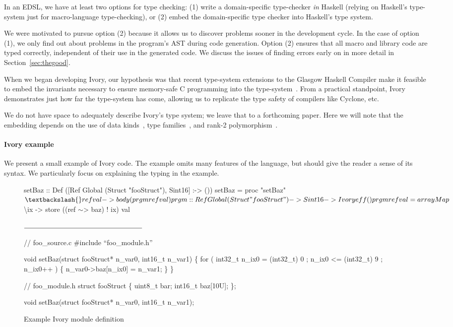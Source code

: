 In an EDSL, we have at least two options for type checking: (1) write a
domain-specific type-checker \emph{in} Haskell (relying on Haskell's type-system
just for macro-language type-checking), or (2) embed the domain-specific type
checker into Haskell's type system.

We were motivated to pursue option (2) because it allows us to discover problems
sooner in the development cycle. In the case of option (1), we only find out
about problems in the program's AST during code generation. Option (2) ensures
that all macro and library code are typed correctly, independent of their use in
the generated code. We discuss the issues of finding errors early on in more
detail in Section~\ref{sec:thegood}.

When we began developing Ivory, our hypothesis  was that recent type-system
extensions to the Glasgow Haskell Compiler make it feasible to embed the
invariants necessary to ensure memory-safe C programming into the
type-system~\cite{dephaskell}. From a practical standpoint, Ivory demonstrates
just how far the type-system has come, allowing us to replicate the type safety
of compilers like Cyclone, etc.

We do not have space to adequately describe Ivory's type system; we leave that
to a forthcoming paper.  Here we will note that the embedding depends on the use
of data kinds~\cite{datakinds}, type families~\cite{typefamilies}, and rank-2
polymorphism~\cite{stmonad}.


\paragraph{Ivory example}
We present a small example of Ivory code.  The example omits many features of
the language, but should give the reader a sense of its syntax.  We particularly
focus on explaining the typing in the example.

\begin{figure}
    \begin{smcode}

setBaz :: Def ([Ref Global (Struct "fooStruct"), Sint16] :-> ())
setBaz = proc "setBaz" $ \textbackslash{}ref val -> body (prgm ref val)

prgm :: Ref Global (Struct "fooStruct") -> Sint16 -> Ivory eff ()
prgm ref val = arrayMap $ \textbackslash{}ix ->
                 store ((ref \(\sim\)> baz) ! ix) val

\(\noindent\rule{6cm}{0.4pt}\)

// foo_source.c
#include ``foo_module.h''

void setBaz(struct fooStruct* n_var0, int16_t n_var1) \{
  for ( int32_t n_ix0 = (int32_t) 0
      ; n_ix0 <= (int32_t) 9
      ; n_ix0++ ) \{
      n_var0->baz[n_ix0] = n_var1;
  \}
\}

// foo_module.h
struct fooStruct \{
    uint8_t bar;
    int16_t baz[10U];
\};

void setBaz(struct fooStruct* n_var0, int16_t n_var1);
\end{smcode}
  \caption{Example Ivory module definition}
  \label{fig:module}
\end{figure}

